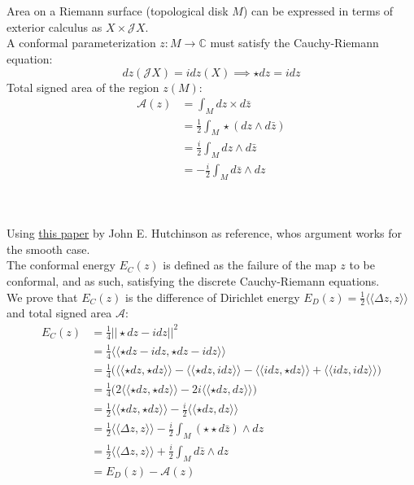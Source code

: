 \documentclass{article}
\newcommand\ifrac[2]{{\displaystyle\frac{#1}{#2}}}
\def\lap{\Delta}
\def\hal{\ifrac{1}{2}}
\def\cA{\mathcal{A}}
\def\cJ{\mathcal{J}}
\def\C{\mathbb{C}}
\def\ll{\langle\langle}
\def\rr{\rangle\rangle}
\begin{document}
\vspace{1.8cm}
\\\\


Area on a Riemann surface (topological disk $M$) can be expressed in terms of exterior calculus as $X \times \cJ X$.\\
A conformal parameterization $z : M \rightarrow \C$ must satisfy the Cauchy-Riemann equation: 
$$ dz(\cJ X) = idz(X) \implies \star dz = idz $$
Total signed area of the region $z(M)$:
\begin{align*}
    \cA(z) &= \int_M dz \times d\bar{z} \\
        &= \hal \int_M \star (dz \wedge d\bar{z}) \tag*{Signed vector area formula} \\
        &= \frac{i}{2} \int_M dz \wedge d\bar{z} \tag*{using Cauchy-Riemann} \\
        &= -\frac{i}{2} \int_M d\bar{z} \wedge dz
\end{align*}


\vspace{1.8cm}
\\\\


Using \href{https://projecteuclid.org/ebooks/proceedings-of-the-centre-for-mathematics-and-its-applications/Theoretical%20and%20Numerical%20Aspects%20of%20Geometric%20Variational%20Problems/chapter/Computing%20conformal%20maps%20and%20minimal%20surfaces/pcma/1416323558}{this paper}
by John E. Hutchinson as reference, whos argument works for the smooth case.\\

The conformal energy $E_C(z)$ is defined as the failure of the map $z$ to be conformal, and as such, satisfying the discrete
Cauchy-Riemann equations.\\

We prove that $E_C(z)$ is the difference of Dirichlet energy $E_D(z) = \hal \ll \lap z, z \rr$ and total signed area $\cA$:
\begin{align*}
    E_C(z) &= \frac14 || \star dz - idz ||^2 \\
        &=  \frac14 \ll \star dz - idz, \star dz - idz \rr \tag*{Inner product is distributive} \\
        &=  \frac14 \Big( \ll \star dz, \star dz \rr - \ll \star dz, idz \rr - \ll idz, \star dz \rr + \ll idz, idz \rr \Big) \\
        &=  \frac14 \Big( 2 \ll \star dz, \star dz \rr - 2i\ll \star dz, dz \rr \Big) \tag*{Inner product is homogeneous} \\
        &=  \hal \ll \star dz, \star dz \rr - \frac{i}{2} \ll \star dz, dz \rr \\
        &=  \hal \ll \lap z, z \rr - \frac{i}{2} \int_M (\star \star d\bar{z}) \wedge dz \\
        &=  \hal \ll \lap z, z \rr + \frac{i}{2} \int_M d\bar{z} \wedge dz \\
        &=  E_D(z) - \cA(z)
\end{align*}
\end{document}
